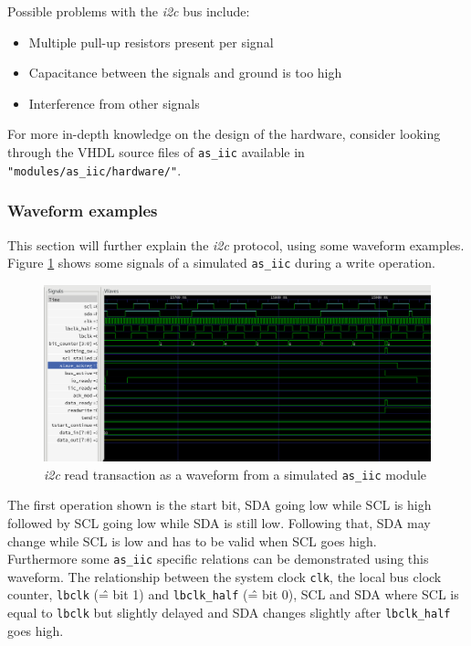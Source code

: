 Possible problems with the \textit{i2c} bus include:

\begin{itemize}
	\item Multiple pull-up resistors present per signal
	\item Capacitance between the signals and ground is too high
	\item Interference from other signals
\end{itemize}

For more in-depth knowledge on the design of the hardware, consider looking through the VHDL source files of \texttt{as\_iic} available in \texttt{"modules/as\_iic/hardware/"}.

\subsubsection*{Waveform examples}

This section will further explain the \textit{i2c} protocol, using some waveform examples.\\
Figure \ref{07-05-as-iic-wave-write} shows some signals of a simulated \texttt{as\_iic} during a write operation.

\begin{figure}[htbp]
\noindent \begin{centering}
\includegraphics[width=\textwidth]{figs/07-05-as-iic-wave-write}
\par\end{centering}
\caption{\textit{i2c} read transaction as a waveform from a simulated \texttt{as\_iic} module}
\label{07-05-as-iic-wave-write}
\end{figure}

The first operation shown is the start bit, SDA going low while SCL is high followed by SCL going low while SDA is still low.
Following that, SDA may change while SCL is low and has to be valid when SCL goes high.\\
Furthermore some \texttt{as\_iic} specific relations can be demonstrated using this waveform.
The relationship between the system clock \texttt{clk}, the local bus clock counter, \texttt{lbclk} (\^= bit 1) and \texttt{lbclk\_half} (\^= bit 0), SCL and SDA where SCL is equal to \texttt{lbclk} but slightly delayed and SDA changes slightly after \texttt{lbclk\_half} goes high.

